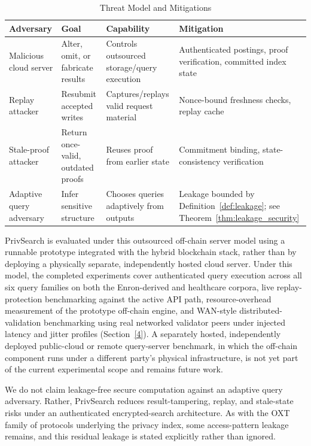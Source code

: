 \begin{table}[t]
\centering
\caption{Threat Model and Mitigations}
\label{tab:threat}
\scriptsize
\setlength{\tabcolsep}{3pt}
\begin{tabular}{p{1.3cm}p{1.4cm}p{1.55cm}p{1.85cm}}
\toprule
\textbf{Adversary} & \textbf{Goal} & \textbf{Capability} & \textbf{Mitigation} \\
\midrule
Malicious cloud server & Alter, omit, or fabricate results & Controls outsourced storage/query execution & Authenticated postings, proof verification, committed index state \\
Replay attacker & Resubmit accepted writes & Captures/replays valid request material & Nonce-bound freshness checks, replay cache \\
Stale-proof attacker & Return once-valid, outdated proofs & Reuses proof from earlier state & Commitment binding, state-consistency verification \\
Adaptive query adversary & Infer sensitive structure & Chooses queries adaptively from outputs & Leakage bounded by Definition~\ref{def:leakage}; see Theorem~\ref{thm:leakage_security} \\
\bottomrule
\end{tabular}
\end{table}
PrivSearch is evaluated under this outsourced off-chain server model using a runnable prototype integrated with the hybrid blockchain stack, rather than by deploying a physically separate, independently hosted cloud server. Under this model, the completed experiments cover authenticated query execution across all six query families on both the Enron-derived and healthcare corpora, live replay-protection benchmarking against the active API path, resource-overhead measurement of the prototype off-chain engine, and WAN-style distributed-validation benchmarking using real networked validator peers under injected latency and jitter profiles (Section~\ref{4}). A separately hosted, independently deployed public-cloud or remote query-server benchmark, in which the off-chain component runs under a different party's physical infrastructure, is not yet part of the current experimental scope and remains future work.

We do not claim leakage-free secure computation against an adaptive query adversary. Rather, PrivSearch reduces result-tampering, replay, and stale-state risks under an authenticated encrypted-search architecture. As with the OXT family of protocols underlying the privacy index, some access-pattern leakage remains, and this residual leakage is stated explicitly rather than ignored.

